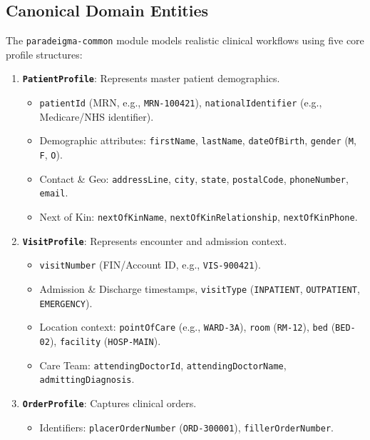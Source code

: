 \subsection{Canonical Domain Entities}

The \texttt{paradeigma-common} module models realistic clinical workflows using five core profile structures:

\begin{enumerate}
    \item \textbf{\texttt{PatientProfile}}: Represents master patient demographics.
    \begin{itemize}
        \item \texttt{patientId} (MRN, e.g., \texttt{MRN-100421}), \texttt{nationalIdentifier} (e.g., Medicare/NHS identifier).
        \item Demographic attributes: \texttt{firstName}, \texttt{lastName}, \texttt{dateOfBirth}, \texttt{gender} (\texttt{M}, \texttt{F}, \texttt{O}).
        \item Contact \& Geo: \texttt{addressLine}, \texttt{city}, \texttt{state}, \texttt{postalCode}, \texttt{phoneNumber}, \texttt{email}.
        \item Next of Kin: \texttt{nextOfKinName}, \texttt{nextOfKinRelationship}, \texttt{nextOfKinPhone}.
    \end{itemize}
    \item \textbf{\texttt{VisitProfile}}: Represents encounter and admission context.
    \begin{itemize}
        \item \texttt{visitNumber} (FIN/Account ID, e.g., \texttt{VIS-900421}).
        \item Admission \& Discharge timestamps, \texttt{visitType} (\texttt{INPATIENT}, \texttt{OUTPATIENT}, \texttt{EMERGENCY}).
        \item Location context: \texttt{pointOfCare} (e.g., \texttt{WARD-3A}), \texttt{room} (\texttt{RM-12}), \texttt{bed} (\texttt{BED-02}), \texttt{facility} (\texttt{HOSP-MAIN}).
        \item Care Team: \texttt{attendingDoctorId}, \texttt{attendingDoctorName}, \texttt{admittingDiagnosis}.
    \end{itemize}
    \item \textbf{\texttt{OrderProfile}}: Captures clinical orders.
    \begin{itemize}
        \item Identifiers: \texttt{placerOrderNumber} (\texttt{ORD-300001}), \texttt{fillerOrderNumber}.

\end{itemize}
\end{enumerate}
